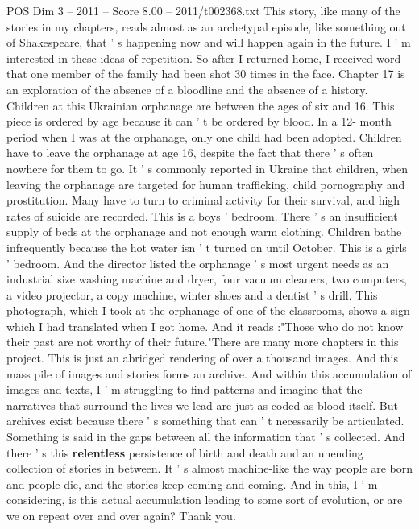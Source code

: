 \begin{textsample}{POS Dim 3 – 2011 – Score 8.00 – 2011/t002368.txt}
This story, like many of the stories in my chapters, reads almost as an archetypal episode, like something out of Shakespeare, that ' s happening now and will happen again in the future.
I ' m interested in these ideas of repetition.
So after I returned home, I received word that one member of the family had been shot 30 times in the face.
Chapter 17 is an exploration of the absence of a bloodline and the absence of a history.
Children at this Ukrainian orphanage are between the ages of six and 16.
This piece is ordered by age because it can ' t be ordered by blood.
In a 12- month period when I was at the orphanage, only one child had been adopted.
Children have to leave the orphanage at age 16, despite the fact that there ' s often nowhere for them to go.
It ' s commonly reported in Ukraine that children, when leaving the orphanage are targeted for human trafficking, child pornography and prostitution.
Many have to turn to criminal activity for their survival, and high rates of suicide are recorded.
This is a boys ' bedroom.
There ' s an insufficient supply of beds at the orphanage and not enough warm clothing.
Children bathe infrequently because the hot water isn ' t turned on until October.
This is a girls ' bedroom.
And the director listed the orphanage ' s most urgent needs as an industrial size washing machine and dryer, four vacuum cleaners, two computers, a video projector, a copy machine, winter shoes and a dentist ' s drill.
This photograph, which I took at the orphanage of one of the classrooms, shows a sign which I had translated when I got home.
And it reads :"Those who do not know their past are not worthy of their future."There are many more chapters in this project.
This is just an abridged rendering of over a thousand images.
And this mass pile of images and stories forms an archive.
And within this accumulation of images and texts, I ' m struggling to find patterns and imagine that the narratives that surround the lives we lead are just as coded as blood itself.
But archives exist because there ' s something that can ' t necessarily be articulated.
Something is said in the gaps between all the information that ' s collected.
And there ' s this \textbf{relentless} persistence of birth and death and an unending collection of stories in between.
It ' s almost machine-like the way people are born and people die, and the stories keep coming and coming.
And in this, I ' m considering, is this actual accumulation leading to some sort of evolution, or are we on repeat over and over again?
Thank you.

\end{textsample}
